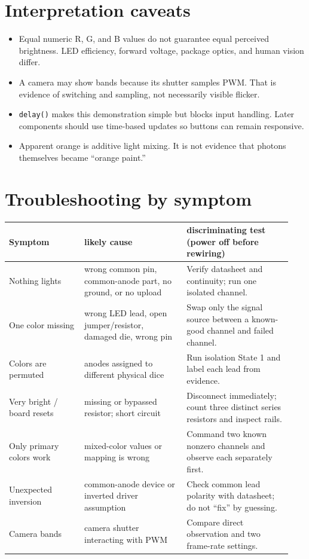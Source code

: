 \documentclass[11pt]{article}
\begin{document}
\section*{Interpretation caveats}
\begin{itemize}
  \item Equal numeric R, G, and B values do not guarantee equal perceived brightness.
        LED efficiency, forward voltage, package optics, and human vision differ.
  \item A camera may show bands because its shutter samples PWM. That is evidence of
        switching and sampling, not necessarily visible flicker.
  \item \texttt{delay()} makes this demonstration simple but blocks input handling.
        Later components should use time-based updates so buttons can remain responsive.
  \item Apparent orange is additive light mixing. It is not evidence that photons
        themselves became ``orange paint.''
\end{itemize}

\section*{Troubleshooting by symptom}
\begin{tabular}{@{}p{0.25\linewidth}p{0.34\linewidth}p{0.35\linewidth}@{}}
\toprule
Symptom & likely cause & discriminating test (power off before rewiring)\\
\midrule
Nothing lights & wrong common pin, common-anode part, no ground, or no upload &
Verify datasheet and continuity; run one isolated channel.\\
One color missing & wrong LED lead, open jumper/resistor, damaged die, wrong pin &
Swap only the signal source between a known-good channel and failed channel.\\
Colors are permuted & anodes assigned to different physical dice &
Run isolation State 1 and label each lead from evidence.\\
Very bright / board resets & missing or bypassed resistor; short circuit &
Disconnect immediately; count three distinct series resistors and inspect rails.\\
Only primary colors work & mixed-color values or mapping is wrong &
Command two known nonzero channels and observe each separately first.\\
Unexpected inversion & common-anode device or inverted driver assumption &
Check common lead polarity with datasheet; do not ``fix'' by guessing.\\
Camera bands & camera shutter interacting with PWM &
Compare direct observation and two frame-rate settings.\\
\bottomrule
\end{tabular}
\end{document}
